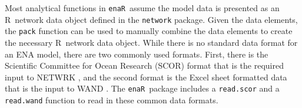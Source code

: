 \documentclass[11pt]{article}
\newcommand{\R}{R}
\newcommand{\enaR}{\texttt{enaR}}
\begin{document}
\begin{spacing}{2}


Most analytical functions in \enaR\ assume the model data is presented
as an \R\ network data object defined in the \texttt{network} package.
Given the data elements, the \texttt{pack} function can be used to
manually combine the data elements to create the necessary \R\ network
data object. While there is no standard data format for an ENA model,
there are two commonly used formats.  First, there is the Scientific
Committee for Ocean Research (SCOR) format that is the required input
to NETWRK \citep{ulanowicz91}, and the second format is the Excel sheet
formatted data that is the input to WAND \citep{allesina04_wand}.  The
\enaR\ package includes a \texttt{read.scor} and a \texttt{read.wand}
function to read in these common data formats.


\end{spacing}
\end{document}
